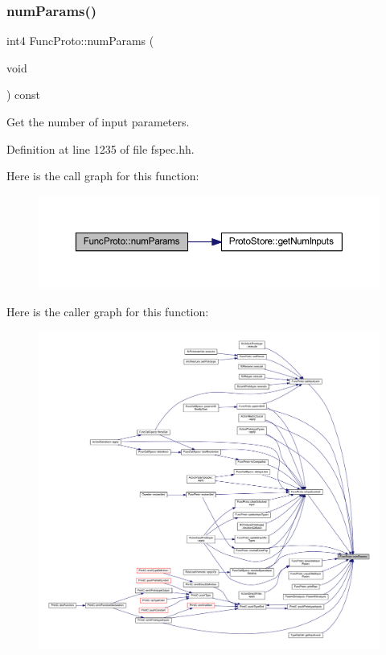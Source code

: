 \subsubsection{\texorpdfstring{numParams()}{numParams()}}
{\footnotesize\ttfamily int4 Func\+Proto\+::num\+Params (\begin{DoxyParamCaption}\item[{void}]{ }\end{DoxyParamCaption}) const\hspace{0.3cm}{\ttfamily [inline]}}



Get the number of input parameters. 



Definition at line 1235 of file fspec.\+hh.

Here is the call graph for this function\+:
\nopagebreak
\begin{figure}[H]
\begin{center}
\leavevmode
\includegraphics[width=350pt]{class_func_proto_a8151d0b73aa51650515ba3f26e73e903_cgraph}
\end{center}
\end{figure}
Here is the caller graph for this function\+:
\nopagebreak
\begin{figure}[H]
\begin{center}
\leavevmode
\includegraphics[width=350pt]{class_func_proto_a8151d0b73aa51650515ba3f26e73e903_icgraph}
\end{center}
\end{figure}
\mbox{\label{class_func_proto_a75f9569f65cd6472f80d3e85d8453ced}} 
